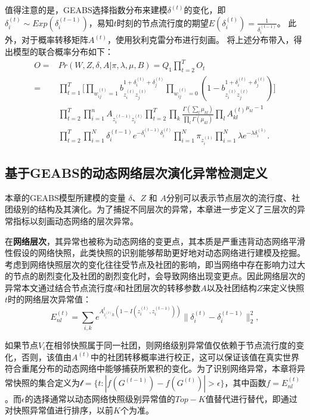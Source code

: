 值得注意的是，GEABS选择指数分布来建模$\delta^{(t)}$的变化，即 $\delta_i^{(t)} \sim Exp(\delta_i^{(t-1)})$，易知$t$时刻的节点流行度的期望$E(\delta_i^{(t)}) = \frac{1}{\delta_i^{(t-1)}}$。
此外，对于概率转移矩阵$A^{(t)}$，使用狄利克雷分布进行刻画。
将上述分布带入，得出模型的联合概率分布如下：
\begin{align}
O = & Pr(W, Z,\delta, A|\pi, \lambda, \mu, B) = Q_1 \prod_{t=2}^{T} O_t \nonumber \\
=  & \prod_{t=1}^{T} \Big[\prod_{w_{ij}^{(t)}=1} b_{z_i^{(t)} z_j^{(t)}}^{1+\delta_i^{(t)}+\delta_j^{(t)}}  \prod_{w_{ij}^{(t)}=0} (1-b_{z_i^{(t)} z_j^{(t)}}^{1+\delta_i^{(t)}+\delta_j^{(t)}})\Big]  \nonumber  \\
& \prod_{t=2}^{T} \prod_{i=1}^{n} A_{z_i^{(t-1)} z_i^{(t)}}  \prod_{t=2}^{T} \prod_{k} \frac{\Gamma (\sum_l \mu_{kl})}{\prod_l \Gamma (\mu_{kl})} \prod_l {A^{(t)}_{kl}}^{\mu_{kl} - 1} \nonumber\\
 &\prod_{t=2}^{T} \prod_{i=1}^{N} \delta_i^{(t-1)} e^{-\delta_i^{(t-1)} \delta_i^{(t)}} \prod_{i=1}^{N} \pi_{z_i^{(1)}}  \prod_{i=1}^{N} \lambda e^{-\lambda \delta_i^{(1)}}. 
\label{eq:O8}
\end{align}

\subsection{基于GEABS的动态网络层次演化异常检测定义}
本章的GEABS模型所建模的变量 $\delta$、$Z$ 和 $A$分别可以表示节点层次的流行度、社团级别的结构及其演化。为了捕捉不同层次的异常，本章进一步定义了三层次的异常指标以刻画动态网络的层次异常。

在\textbf{网络层次}，其异常也被称为动态网络的变更点，其本质是严重违背动态网络平滑性假设的网络快照，此类快照的识别能够帮助更好地对动态网络进行建模及挖掘。考虑到网络快照层次的变化往往受节点及社团的影响，即当网络中存在影响力过大的节点的剧烈变化及社团的剧烈变化时，会导致网络出现变更点。因此网络层次的异常本文通过结合节点流行度$\delta$和社团层次的转移参数$A$以及社团结构$Z$来定义快照$t$时的网络层次异常值：
\begin{equation}
    E_{nl}^{(t)} = \sum_{i, k} e^{A_{z_i^{(t)} k}^t  (1-I(z_i^{(t)},z_i^{(t-1)}))} \| \delta_i^{(t)} - \delta_i^{(t-1)} \|_2^2,
\label{eq:O9}
\end{equation}

如果节点$V_i$在相邻快照属于同一社团，则网络级别异常值仅依赖于节点流行度的变化，否则，该值由$A^{(t)}$中的社团转移概率进行校正，这可以保证该值在真实世界符合重尾分布的动态网络中能够捕获所累积的变化。为了识别网络异常，本章将异常快照的集合定义为$\mathcal{t} = \{t : |f(G^{(t-1)}) -f(G^{(t)})| > \epsilon  \}$，其中函数$f = E_{nl}^{(t)}$。而$\epsilon$的选择通常以动态网络快照级别异常值的$Top-K$值替代进行替代，即通过对快照异常值进行排序，以前$K$个为准。

